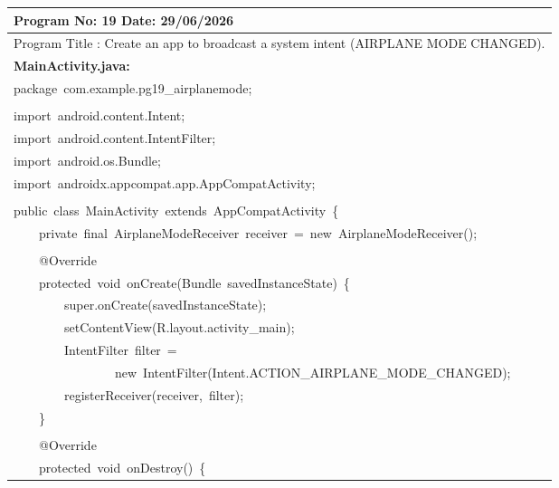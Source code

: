 \documentclass[a4paper,12pt]{article}
\begin{document}
\newpage

\noindent\begingroup
\renewcommand{\arraystretch}{1.1}
\begin{longtable}{|p{}|}
\hline\endfirsthead\hline\endhead\hline\endfoot\hline\endlastfoot
\rule{0pt}{13pt}Program No: 19 \hfill Date: 29/06/2026 \\
\hline
\rule{0pt}{13pt}Program Title : Create an app to broadcast a system intent (AIRPLANE MODE CHANGED). \\
\hline
\rule{0pt}{13pt}\textbf{MainActivity.java:} \\
\hline
{\ttfamily\small package\ com.example.pg19\_airplanemode;} \\
\strut \\
{\ttfamily\small import\ android.content.Intent;} \\
{\ttfamily\small import\ android.content.IntentFilter;} \\
{\ttfamily\small import\ android.os.Bundle;} \\
{\ttfamily\small import\ androidx.appcompat.app.AppCompatActivity;} \\
\strut \\
{\ttfamily\small public\ class\ MainActivity\ extends\ AppCompatActivity\ \{} \\
{\ttfamily\small \ \ \ \ private\ final\ AirplaneModeReceiver\ receiver\ =\ new\ AirplaneModeReceiver();} \\
\strut \\
{\ttfamily\small \ \ \ \ @Override} \\
{\ttfamily\small \ \ \ \ protected\ void\ onCreate(Bundle\ savedInstanceState)\ \{} \\
{\ttfamily\small \ \ \ \ \ \ \ \ super.onCreate(savedInstanceState);} \\
{\ttfamily\small \ \ \ \ \ \ \ \ setContentView(R.layout.activity\_main);} \\
{\ttfamily\small \ \ \ \ \ \ \ \ IntentFilter\ filter\ =\ } \\
{\ttfamily\small \ \ \ \ \ \ \ \ \ \ \ \ \ \ \ \ new\ IntentFilter(Intent.ACTION\_AIRPLANE\_MODE\_CHANGED);} \\
{\ttfamily\small \ \ \ \ \ \ \ \ registerReceiver(receiver,\ filter);} \\
{\ttfamily\small \ \ \ \ \}} \\
\strut \\
{\ttfamily\small \ \ \ \ @Override} \\
{\ttfamily\small \ \ \ \ protected\ void\ onDestroy()\ \{} \\

\end{longtable}
\end{document}
